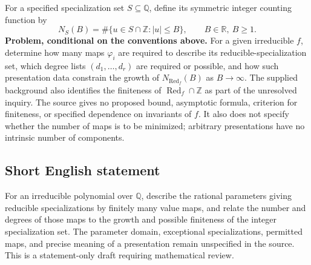 \documentclass[11pt]{article}
\newcommand{\Z}{\mathbb{Z}}
\newcommand{\Q}{\mathbb{Q}}
\newcommand{\R}{\mathbb{R}}
\begin{document}
For a specified specialization set \(S\subseteq\Q\), define its symmetric integer counting function by
\[
N_S(B)=\#\{u\in S\cap\Z:|u|\leq B\},\qquad B\in\R,\ B\geq1.
\]
\textbf{Problem, conditional on the conventions above.} For a given irreducible \(f\), determine how many maps \(\varphi_i\) are required to describe its reducible-specialization set, which degree lists \((d_1,\ldots,d_r)\) are required or possible, and how such presentation data constrain the growth of \(N_{\operatorname{Red}_f}(B)\) as \(B\to\infty\). The supplied background also identifies the finiteness of \(\operatorname{Red}_f\cap\Z\) as part of the unresolved inquiry. The source gives no proposed bound, asymptotic formula, criterion for finiteness, or specified dependence on invariants of \(f\). It also does not specify whether the number of maps is to be minimized; arbitrary presentations have no intrinsic number of components.
\subsection{Short English statement}
For an irreducible polynomial over \(\Q\), describe the rational parameters giving reducible specializations by finitely many value maps, and relate the number and degrees of those maps to the growth and possible finiteness of the integer specialization set. The parameter domain, exceptional specializations, permitted maps, and precise meaning of a presentation remain unspecified in the source. This is a statement-only draft requiring mathematical review.
\end{document}

